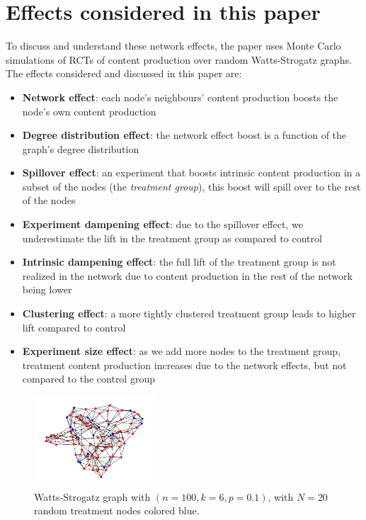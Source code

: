\documentclass[final,5p,times,twocolumn,authoryear]{elsarticle}
\begin{document}
\section{Effects considered in this paper}

To discuss and understand these network effects, the paper uses Monte Carlo simulations of RCTs of content production over random Watts-Strogatz graphs. The effects considered and discussed in this paper are:

\begin{itemize}
\setlength\itemsep{0em}
    \item \textbf{Network effect}: each node's neighbours' content production boosts the node's own content production
    \item \textbf{Degree distribution effect}: the network effect boost is a function of the graph's degree distribution
    \item \textbf{Spillover effect}: an experiment that boosts intrinsic content production in a subset of the nodes (the \textit{treatment group}), this boost will spill over to the rest of the nodes
    \item \textbf{Experiment dampening effect}: due to the spillover effect, we underestimate the lift in the treatment group as compared to control
    \item \textbf{Intrinsic dampening effect}: the full lift of the treatment group is not realized in the network due to content production in the rest of the network being lower
    \item \textbf{Clustering effect}: a more tightly clustered treatment group leads to higher lift compared to control
    \item \textbf{Experiment size effect}: as we add more nodes to the treatment group, treatment content production increases due to the network effects, but not compared to the control group
\end{itemize}

\begin{figure}[h]
	\centering 
	\includegraphics[width=0.4\textwidth]{figure-1.png}	
	\caption{Watts-Strogatz graph with $(n=100, k=6, p=0.1)$, with $N=20$ random treatment nodes colored blue.} 
\end{figure}
\end{document}
